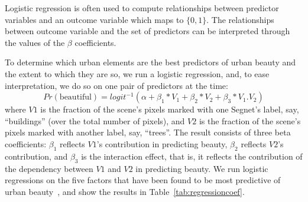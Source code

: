 \begin{table}[t!]
    \centering
    \caption{Coefficients of logistic regressions run on one pair of predictors at the time.}
    \label{tab:regressioncoef}
\end{table}

Logistic regression is often used to compute relationships between predictor variables and an outcome variable which maps to $\{0,1\}$. The relationships between outcome variable and the set of predictors can be interpreted through the values of the $\beta$ coefficients.

To determine which urban elements are the best predictors of urban beauty and the extent to which they are so, we run a logistic regression, and, to ease interpretation, we do so on one pair of predictors at the time: 
\begin{equation}
Pr(\textrm{beautiful}) = logit^{-1}(\alpha + \beta_1 * V_1 + \beta_2 * V_2  + \beta_3 * V_{1}.V_{2} )
\label{eq:regression} 
\end{equation}
where $V1$ is the fraction of the scene's pixels marked with one Segnet's label, say, ``buildings'' (over the total number of pixels),  and $V2$ is the fraction of the scene's pixels marked with another label, say, ``trees''. The result consists of three beta coefficients: $\beta_1$ reflects $V1$'s contribution in predicting beauty,  $\beta_2$ reflects $V2$'s contribution, and $\beta_3$ is the interaction effect, that is, it reflects the contribution of the dependency between $V1$ and $V2$ in predicting beauty. We run logistic regressions on the five factors that have been found to be most predictive of urban beauty~\cite{quercia2014aesthetic, ewing2013measuring, alexander1977pattern}, and show the results in Table~\ref{tab:regressioncoef}.


